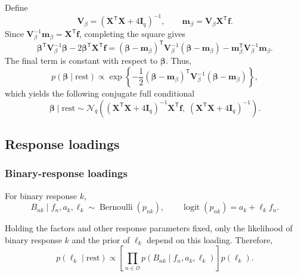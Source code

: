 \documentclass[pdftex,12pt,openright,a4paper,oneside]{book}
\begin{document}
Define
\begin{equation*}
\mathbf{V}_{\beta}
=
(\mathbf{X}^{\mathsf T}\mathbf{X}
+4\mathbf{I}_q)^{-1},
\qquad
\mathbf{m}_{\beta}
=
\mathbf{V}_{\beta}\mathbf{X}^{\mathsf T}\mathbf{f}.
\end{equation*}
Since
$\mathbf{V}_{\beta}^{-1}\mathbf{m}_{\beta}
=\mathbf{X}^{\mathsf T}\mathbf{f}$,
completing the square gives
\begin{equation*}
\boldsymbol{\beta}^{\mathsf T}
\mathbf{V}_{\beta}^{-1}\boldsymbol{\beta}-
2\boldsymbol{\beta}^{\mathsf T}
\mathbf{X}^{\mathsf T}\mathbf{f}=
(\boldsymbol{\beta}-\mathbf{m}_{\beta})^{\mathsf T}
\mathbf{V}_{\beta}^{-1}
(\boldsymbol{\beta}-\mathbf{m}_{\beta})-
\mathbf{m}_{\beta}^{\mathsf T}
\mathbf{V}_{\beta}^{-1}\mathbf{m}_{\beta}.
\end{equation*}
The final term is constant with respect to
$\boldsymbol{\beta}$. Thus,
\begin{equation*}
p(\boldsymbol{\beta}\mid\mathrm{rest})
\propto
\exp\!\left\{
-\frac12
(\boldsymbol{\beta}-\mathbf{m}_{\beta})^{\mathsf T}
\mathbf{V}_{\beta}^{-1}
(\boldsymbol{\beta}-\mathbf{m}_{\beta})
\right\},
\end{equation*}
which yields the following conjugate full conditional
\begin{equation*}
\boldsymbol{\beta}\mid\mathrm{rest}
\sim
\mathcal{N}_q\!\left(
(\mathbf{X}^{\mathsf T}\mathbf{X}
+4\mathbf{I}_q)^{-1}
\mathbf{X}^{\mathsf T}\mathbf{f},
\;
(\mathbf{X}^{\mathsf T}\mathbf{X}
+4\mathbf{I}_q)^{-1}
\right).
\end{equation*}


\subsection{Response loadings}
\label{app:loading_conditionals}

\subsubsection{Binary-response loadings}

For binary response $k$,
\begin{equation*}
B_{nk}\mid f_n,a_k,\ell_k
\sim\operatorname{Bernoulli}(p_{nk}),
\qquad
\operatorname{logit}(p_{nk})=a_k+\ell_kf_n.
\end{equation*}

Holding the factors and other response parameters
fixed, only the likelihood of binary response $k$
and the prior of $\ell_k$ depend on this loading.
Therefore,
\begin{equation*}
p(\ell_k\mid\mathrm{rest})
\propto
\left[
\prod_{n\in\mathcal{O}}
p(B_{nk}\mid f_n,a_k,\ell_k)
\right]
p(\ell_k).
\end{equation*}
\end{document}
